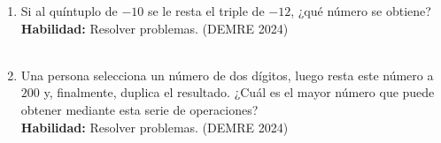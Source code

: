 \documentclass[11pt,letterpaper]{article}
\newenvironment{alternativas}{%
\begin{enumerate}[label=\Alph*), leftmargin=14pt, itemsep=2pt, topsep=2pt]
}{\end{enumerate}}
\begin{document}
\begin{enumerate}[label=\textbf{\arabic*.}, leftmargin=*, itemsep=8pt, start=6]
\item
\begin{minipage}[t]{\linewidth}
Si al quíntuplo de $-10$ se le resta el triple de $-12$, ¿qué número se obtiene?\\
\textbf{Habilidad:} Resolver problemas. (DEMRE 2024)\\
\\%
\begin{minipage}{\linewidth}
\vspace{7mm}
\end{minipage}
\vspace{7mm}
\end{minipage}

\item
\begin{minipage}[t]{\linewidth}
Una persona selecciona un número de dos dígitos, luego resta este número a $200$ y, finalmente, duplica el resultado. ¿Cuál es el mayor número que puede obtener mediante esta serie de operaciones?\\
\textbf{Habilidad:} Resolver problemas. (DEMRE 2024)\\
\\%
\begin{minipage}{\linewidth}
\vspace{7mm}
\end{minipage}
\vspace{7mm}
\end{minipage}


\end{enumerate}
\end{document}

